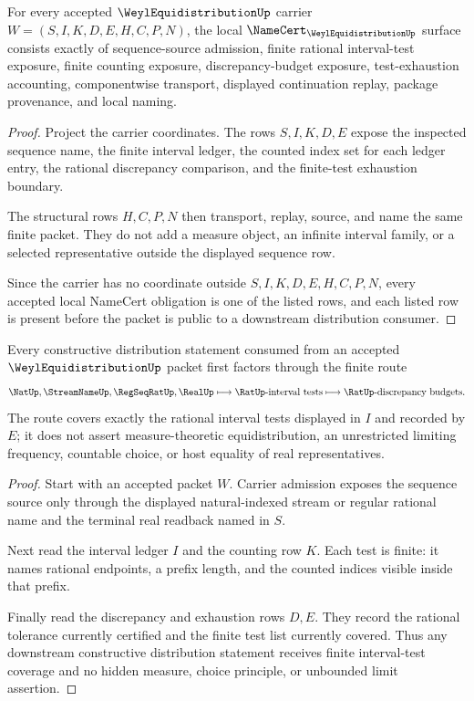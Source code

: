 \begin{theorem}
\label{thm:weyl-equidistribution-namecert-obligations}
For every accepted $\WeylEquidistributionUp$ carrier $W=(S,I,K,D,E,H,C,P,N)$, the local $\NameCert_{\WeylEquidistributionUp}$ surface consists exactly of sequence-source admission, finite rational interval-test exposure, finite counting exposure, discrepancy-budget exposure, test-exhaustion accounting, componentwise transport, displayed continuation replay, package provenance, and local naming.
\end{theorem}
\begin{proof}
Project the carrier coordinates. The rows $S,I,K,D,E$ expose the inspected sequence name, the finite interval ledger, the counted index set for each ledger entry, the rational discrepancy comparison, and the finite-test exhaustion boundary.

The structural rows $H,C,P,N$ then transport, replay, source, and name the same finite packet. They do not add a measure object, an infinite interval family, or a selected representative outside the displayed sequence row.

Since the carrier has no coordinate outside $S,I,K,D,E,H,C,P,N$, every accepted local NameCert obligation is one of the listed rows, and each listed row is present before the packet is public to a downstream distribution consumer.
\end{proof}

\begin{theorem}
\label{thm:weyl-equidistribution-interval-test-coverage}
Every constructive distribution statement consumed from an accepted $\WeylEquidistributionUp$ packet first factors through the finite route
$$
\NatUp,\StreamNameUp,\RegSeqRatUp,\RealUp \longmapsto \RatUp\text{-interval tests} \longmapsto \RatUp\text{-discrepancy budgets}.
$$
The route covers exactly the rational interval tests displayed in $I$ and recorded by $E$; it does not assert measure-theoretic equidistribution, an unrestricted limiting frequency, countable choice, or host equality of real representatives.
\end{theorem}
\begin{proof}
Start with an accepted packet $W$. Carrier admission exposes the sequence source only through the displayed natural-indexed stream or regular rational name and the terminal real readback named in $S$.

Next read the interval ledger $I$ and the counting row $K$. Each test is finite: it names rational endpoints, a prefix length, and the counted indices visible inside that prefix.

Finally read the discrepancy and exhaustion rows $D,E$. They record the rational tolerance currently certified and the finite test list currently covered. Thus any downstream constructive distribution statement receives finite interval-test coverage and no hidden measure, choice principle, or unbounded limit assertion.
\end{proof}

